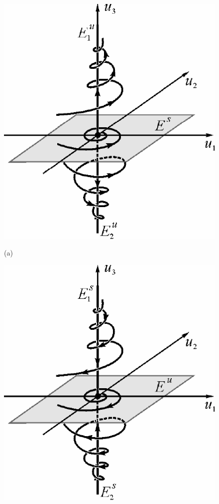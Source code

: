 \begin{figure}[h!]
        \centering
        \begin{minipage}{0.45\linewidth}
                \centering  
                \includegraphics[]{fig/lect4/5a}

                (a)
        \end{minipage}
        \begin{minipage}{0.45\linewidth}
                \centering  
                \includegraphics[]{fig/lect4/5b}


\end{minipage}
\end{figure}
